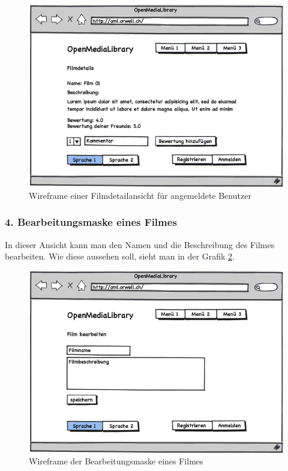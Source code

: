 \begin{figure}[ht]
    \begin{center}
        \includegraphics[width=1\textwidth,angle=0]{./wireframes/04_03_detail_angemeldet.png}
        \caption{Wireframe einer Filmdetailansicht für angemeldete Benutzer}
        \label{04_03_detail_angemeldet}
    \end{center}
\end{figure}

\subsubsection{4. Bearbeitungsmaske eines Filmes}
In dieser Ansicht kann man den Namen und die Beschreibung des Filmes bearbeiten.
Wie diese aussehen soll, sieht man in der Grafik \ref{04_04_edit}.

\begin{figure}[ht]
    \begin{center}
        \includegraphics[width=1\textwidth,angle=0]{./wireframes/04_04_edit.png}
        \caption{Wireframe der Bearbeitungsmaske eines Filmes}
        \label{04_04_edit}
    \end{center}
\end{figure}


